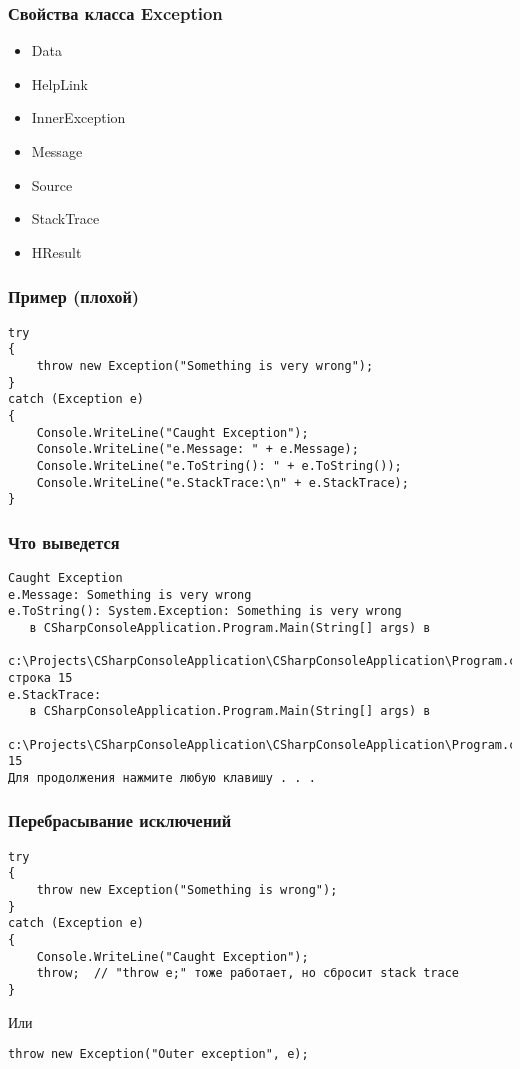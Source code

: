 \documentclass[xetex,mathserif,serif]{beamer}
\begin{document}
    \begin{frame}[fragile]
        \frametitle{Свойства класса Exception}
        \begin{itemize}
            \item Data
            \item HelpLink
            \item InnerException
            \item Message
            \item Source
            \item StackTrace
            \item HResult
        \end{itemize}
    \end{frame}

    \begin{frame}[fragile]
        \frametitle{Пример (плохой)}
        \begin{verbatim}
try
{
    throw new Exception("Something is very wrong");
}
catch (Exception e)
{
    Console.WriteLine("Caught Exception");
    Console.WriteLine("e.Message: " + e.Message);
    Console.WriteLine("e.ToString(): " + e.ToString());
    Console.WriteLine("e.StackTrace:\n" + e.StackTrace);
}
        \end{verbatim}
    \end{frame}

    \begin{frame}[fragile]
        \frametitle{Что выведется}
        \begin{scriptsize}
            \begin{verbatim}
Caught Exception
e.Message: Something is very wrong
e.ToString(): System.Exception: Something is very wrong
   в CSharpConsoleApplication.Program.Main(String[] args) в 
       c:\Projects\CSharpConsoleApplication\CSharpConsoleApplication\Program.cs: строка 15
e.StackTrace:
   в CSharpConsoleApplication.Program.Main(String[] args) в 
       c:\Projects\CSharpConsoleApplication\CSharpConsoleApplication\Program.cs:строка 15
Для продолжения нажмите любую клавишу . . .
            \end{verbatim}
        \end{scriptsize}
    \end{frame}

    \begin{frame}[fragile]
        \frametitle{Перебрасывание исключений}
        \begin{verbatim}
try
{
    throw new Exception("Something is wrong");
}
catch (Exception e)
{
    Console.WriteLine("Caught Exception");
    throw;  // "throw e;" тоже работает, но сбросит stack trace
}
        \end{verbatim}

        Или
        \begin{verbatim}
throw new Exception("Outer exception", e);
        \end{verbatim}
    \end{frame}
\end{document}
